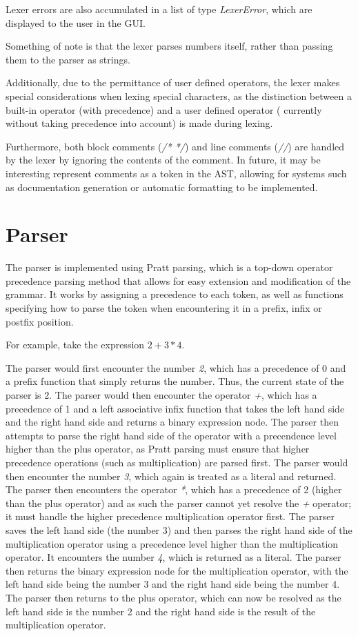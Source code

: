 Lexer errors are also accumulated in a list of type \textit{LexerError}, which are displayed to the user in the GUI\@.

Something of note is that the lexer parses numbers itself, rather than passing them to the parser as strings.

Additionally, due to the permittance of user defined operators, the lexer makes special considerations when lexing 
special characters, as the distinction between a built-in operator (with precedence) and a user defined operator (
currently without taking precedence into account) is made during lexing.

Furthermore, both block comments (\textit{/* */}) and line comments (\textit{//}) are handled by the lexer by ignoring
the contents of the comment.
In future, it may be interesting represent comments as a token in the AST, allowing for systems such as documentation
generation or automatic formatting to be implemented.

\section{Parser}\label{sec:parser}

The parser is implemented using Pratt parsing\citep{pratt1973top}, which is a top-down operator precedence parsing 
method that allows for easy extension and modification of the grammar.
It works by assigning a precedence to each token, as well as functions specifying how to parse the token when 
encountering it in a prefix, infix or postfix position.

For example, take the expression $2 + 3 * 4$.

The parser would first encounter the number \textit{2}, which has a precedence of 0 and a prefix function that
simply returns the number.
Thus, the current state of the parser is $2$.
The parser would then encounter the operator \textit{+}, which has a precedence of 1 and a left associative infix
function that takes the left hand side and the right hand side and returns a binary expression node.
The parser then attempts to parse the right hand side of the operator with a precendence level higher than the
plus operator, as Pratt parsing must ensure that higher precedence operations (such as multiplication) are parsed
first.
The parser would then encounter the number \textit{3}, which again is treated as a literal and returned.
The parser then encounters the operator \textit{*}, which has a precedence of 2 (higher than the plus operator) and 
as such the parser cannot yet resolve the \textit{+} operator; it must handle the higher precedence multiplication
operator first.
The parser saves the left hand side (the number 3) and then parses the right hand side of the multiplication 
operator using a precedence level higher than the multiplication operator.
It encounters the number \textit{4}, which is returned as a literal.
The parser then returns the binary expression node for the multiplication operator, with the left hand side being
the number 3 and the right hand side being the number 4.
The parser then returns to the plus operator, which can now be resolved as the left hand side is the number 2 and the
right hand side is the result of the multiplication operator.


